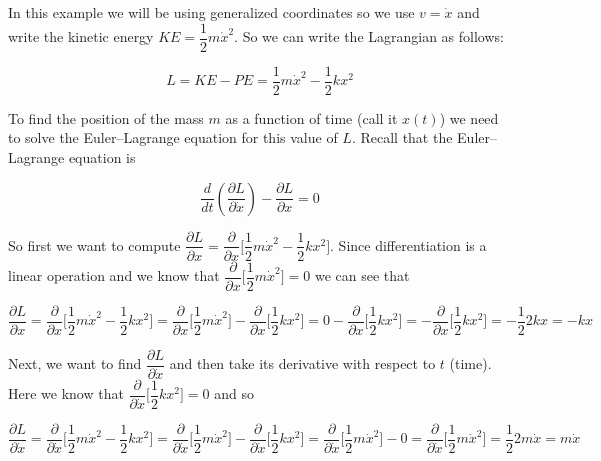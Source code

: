 \documentclass{article}
\theoremstyle{definition}
\begin{document}
\noindent
In this example we will be using generalized coordinates so we
use $v = \dot{x}$ and write the kinetic energy $KE = \dfrac{1}{2}
m \dot{x}^2$. So we can write the Lagrangian as follows:

\bigskip
\begin{equation*}
L = KE - PE = \dfrac{1}{2} m \dot{x}^2 - \dfrac{1}{2} k x^2
\end{equation*}


\bigskip
\noindent
To find the position of the mass $m$ as a function of time (call
it $x(t)$) we need to solve the Euler–Lagrange equation for this
value of $L$. Recall that the  Euler–Lagrange equation is


\bigskip
\begin{equation*}
\dfrac{d}{dt} \left ( \dfrac{\partial L}{\partial \dot{x}} \right ) -  \dfrac{\partial L}{\partial x} = 0
\end{equation*}

\bigskip
\noindent
So first we want to compute $\dfrac{\partial L}{\partial x} =
\dfrac{\partial}{\partial x}  \bigg [ \dfrac{1}{2} m \dot{x}^2  -
\dfrac{1}{2} k x^2 \bigg ]$. Since differentiation is a linear
operation \cite{wiki:linearity_of_differentiation} and we know
that $\dfrac{\partial}{\partial x} \bigg [\dfrac{1}{2} m
\dot{x}^2  \bigg ] = 0$ we can see that  

\bigskip
\begin{equation*}
\dfrac{\partial L}{\partial x} = \dfrac{\partial}{\partial x}  \bigg [ \dfrac{1}{2} m \dot{x}^2  - \dfrac{1}{2} k x^2 \bigg ] 
= \dfrac{\partial}{\partial x} \bigg [\dfrac{1}{2} m \dot{x}^2  \bigg ] - \dfrac{\partial}{\partial x} \bigg [\dfrac{1}{2} k x^2  \bigg ]  
=  0 - \dfrac{\partial}{\partial x} \bigg [\dfrac{1}{2} k x^2  \bigg ] 
= - \dfrac{\partial}{\partial x} \bigg [ \dfrac{1}{2} k x^2  \bigg ]  
= - \dfrac{1}{2} 2 k x = -kx
\end{equation*}

\bigskip
\noindent
Next, we want to find  $\dfrac{\partial L}{\partial \dot{x}}$ and
then take its derivative with respect to $t$ (time). Here we know
that $\dfrac{\partial}{\partial \dot{x}} \Bigg [ \dfrac{1}{2} k
x^2 \Bigg ] = 0$ and so 


\begin{equation*}
\dfrac{\partial L}{\partial \dot{x}} = \dfrac{\partial}{\partial \dot{x}} \Bigg [   \dfrac{1}{2} m \dot{x}^2 - \dfrac{1}{2} k x^2 \Bigg ] 
= \dfrac{\partial}{\partial \dot{x}} \Bigg [ \dfrac{1}{2} m \dot{x}^2 \Bigg ] - \dfrac{\partial}{\partial \dot{x}} \Bigg [  \dfrac{1}{2} k x^2 \Bigg ] 
= \dfrac{\partial}{\partial \dot{x}} \Bigg [  \dfrac{1}{2} m \dot{x}^2 \Bigg ]  - 0
= \dfrac{\partial}{\partial \dot{x}} \Bigg [  \dfrac{1}{2} m \dot{x}^2 \Bigg ] =  \dfrac{1}{2} 2 m \dot{x} = m \dot{x}
\end{equation*}
\end{document}
